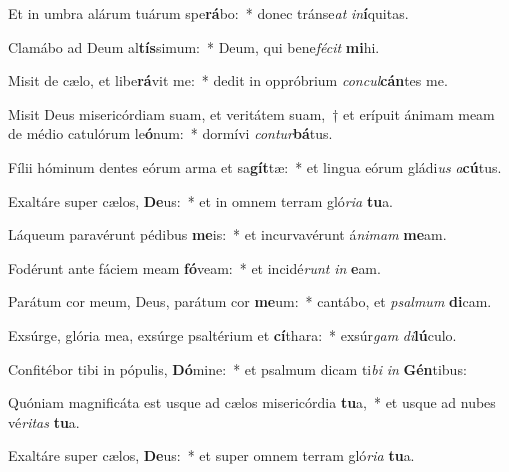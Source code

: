 \item Et in umbra alárum tuárum spe\textbf{rá}bo:~* donec tránse\textit{at} \textit{in}\textbf{í}quitas.
\item Clamábo ad Deum al\textbf{tís}simum:~* Deum, qui bene\textit{fé}\textit{cit} \textbf{mi}hi.
\item Misit de cælo, et libe\textbf{rá}vit me:~* dedit in oppróbrium \textit{con}\textit{cul}\textbf{cán}tes me.
\item Misit Deus misericórdiam suam, et veritátem suam,~† et erípuit ánimam meam de médio catulórum le\textbf{ó}num:~* dormívi \textit{con}\textit{tur}\textbf{bá}tus.
\item Fílii hóminum dentes eórum arma et sa\textbf{gít}tæ:~* et lingua eórum gládi\textit{us} \textit{a}\textbf{cú}tus.
\item Exaltáre super cælos, \textbf{De}us:~* et in omnem terram gló\textit{ri}\textit{a} \textbf{tu}a.
\item Láqueum paravérunt pédibus \textbf{me}is:~* et incurvavérunt á\textit{ni}\textit{mam} \textbf{me}am.
\item Fodérunt ante fáciem meam \textbf{fó}veam:~* et incidé\textit{runt} \textit{in} \textbf{e}am.
\item Parátum cor meum, Deus, parátum cor \textbf{me}um:~* cantábo, et \textit{psal}\textit{mum} \textbf{di}cam.
\item Exsúrge, glória mea, exsúrge psaltérium et \textbf{cí}thara:~* exsúr\textit{gam} \textit{di}\textbf{lú}culo.
\item Confitébor tibi in pópulis, \textbf{Dó}mine:~* et psalmum dicam ti\textit{bi} \textit{in} \textbf{Gén}tibus:
\item Quóniam magnificáta est usque ad cælos misericórdia \textbf{tu}a,~* et usque ad nubes vé\textit{ri}\textit{tas} \textbf{tu}a.
\item Exaltáre super cælos, \textbf{De}us:~* et super omnem terram gló\textit{ri}\textit{a} \textbf{tu}a.
